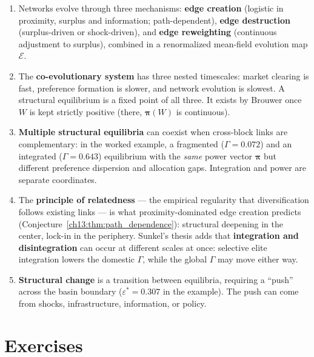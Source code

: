 \documentclass[../structural_economics_book.tex]{subfiles}
\begin{document}
\begin{enumerate}
\item Networks evolve through three mechanisms: \textbf{edge creation} (logistic in proximity, surplus and information; path-dependent), \textbf{edge destruction} (surplus-driven or shock-driven), and \textbf{edge reweighting} (continuous adjustment to surplus), combined in a renormalized mean-field evolution map $\mathcal{E}$.

\item The \textbf{co-evolutionary system} has three nested timescales: market clearing is fast, preference formation is slower, and network evolution is slowest. A structural equilibrium is a fixed point of all three. It exists by Brouwer once $W$ is kept strictly positive (there, $\boldsymbol{\pi}(W)$ is continuous).

\item \textbf{Multiple structural equilibria} can coexist when cross-block links are complementary: in the worked example, a fragmented ($\Gamma = 0.072$) and an integrated ($\Gamma = 0.643$) equilibrium with the \emph{same} power vector $\boldsymbol{\pi}$ but different preference dispersion and allocation gaps. Integration and power are separate coordinates.

\item The \textbf{principle of relatedness} --- the empirical regularity that diversification follows existing links --- is what proximity-dominated edge creation predicts (Conjecture~\ref{ch13:thm:path_dependence}): structural deepening in the center, lock-in in the periphery. Sunkel's thesis adds that \textbf{integration and disintegration} can occur at different scales at once: selective elite integration lowers the domestic $\Gamma$, while the global $\Gamma$ may move either way.

\item \textbf{Structural change} is a transition between equilibria, requiring a ``push'' across the basin boundary ($\varepsilon^* = 0.307$ in the example). The push can come from shocks, infrastructure, information, or policy.
\end{enumerate}


\section{Exercises}
\label{ch13:sec:exercises}
\end{document}
